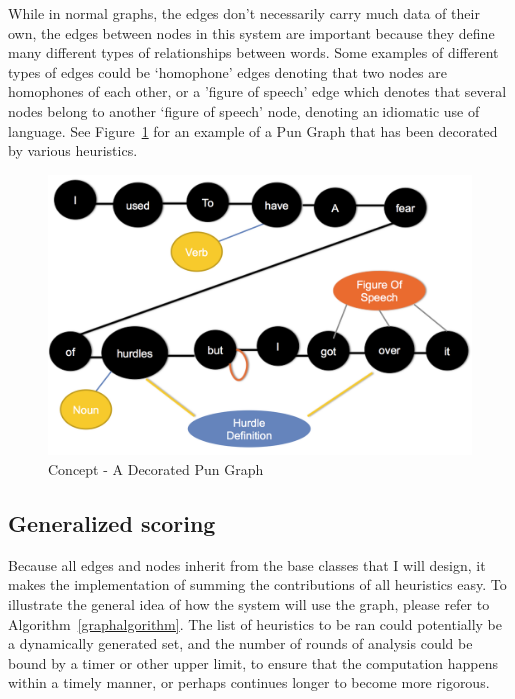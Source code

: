 While in normal graphs, the edges don't necessarily carry much data of their own, the edges between nodes in this system are important because they define many different types of relationships between words. Some examples of different types of edges could be `homophone' edges denoting that two nodes are homophones of each other, or a 'figure of speech' edge which denotes that several nodes belong to another `figure of speech' node, denoting an idiomatic use of language. See Figure~\ref{pungraph} for an example of a Pun Graph that has been decorated by various heuristics.

\begin{center}
\begin{figure}[h]
  \includegraphics[keepaspectratio=true, scale=.35]{pun-graph-example.png}
  \caption{Concept - A Decorated Pun Graph}
   \label{pungraph}
\end{figure}
\end{center}

\subsection{Generalized scoring}
Because all edges and nodes inherit from the base classes that I will design, it makes the implementation of summing the contributions of all heuristics easy. To illustrate the general idea of how the system will use the graph, please refer to Algorithm~\ref{graphalgorithm}. The list of heuristics to be ran could potentially be a dynamically generated set, and the number of rounds of analysis could be bound by a timer or other upper limit, to ensure that the computation happens within a timely manner, or perhaps continues longer to become more rigorous.

